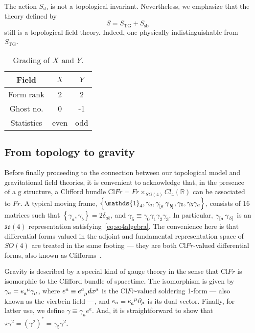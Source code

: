 \documentclass[../main.tex]{subfiles}
\begin{document}
The action $S_{\text{sb}}$ is not a topological invariant. Nevertheless, we emphasize that the theory defined by
\begin{equation}
  \label{eq:tg+sb}
  S=S_{\text{TG}}+S_{\text{sb}}
\end{equation}
still is a topological field theory. Indeed, one physically indistinguishable from $S_{\text{TG}}$.
\begin{table}[htpb]
  \caption{Grading of $X$ and $Y$.}%
  \label{tab:grading2}
  \begin{tabular}{ccc}
    \toprule
    Field      & $X$  & $Y$ \\
    \midrule
    Form rank  & 2    & 2   \\
    Ghost no.  & 0    & -1  \\
    Statistics & even & odd \\
    \bottomrule
  \end{tabular}
\end{table}

\subsection{From topology to gravity}%
\label{ssec:from_top_to_grav;sec:top_grav}

Before finally proceeding to the connection between our topological model and gravitational field theories, it is convenient to acknowledge that, in the presence of a $ \mathrm{g} $ structure, a Clifford bundle $ \mathrm{Cl} Fr= Fr \times_{SO(4)}Cl_4 \left( \mathbb{R} \right)$ can be associated to $ Fr $. A typical moving frame, $\left\{ \mathds{1}_4, \gamma_a, \tensor{ \gamma }{ _{ \left[ a \right. } } \tensor{ \gamma }{ _{ \left. b \right] } }, \gamma_5, \gamma_5 \gamma_a \right\}$, consists of 16 matrices such that $ \left\{ \gamma_a, \gamma_b \right\} = 2 \delta_{ab}$, and $\gamma_5 \equiv \gamma_0 \gamma_1 \gamma_2 \gamma_3 $. In particular, $\tensor{ \gamma }{ _{ \left[ a \right. } } \tensor{ \gamma }{ _{ \left. b \right] } }$ is an $\mathfrak{so}\left( 4 \right)$ representation satisfying~\eqref{eq:so4algebra}. The convenience here is that differential forms valued in the adjoint and fundamental representation space of $SO(4)$ are treated in the same footing --- they are both $ \mathrm{Cl}Fr $-valued differential forms, also known as Clifforms~\cite{benn1987a,mielke2001a,mielke2017a}. %

Gravity is described by a special kind of gauge theory in the sense that $ \mathrm{Cl}Fr $ is isomorphic to the Clifford bundle of spacetime. The isomorphism is given by $\gamma_a = \tensor{ e }{ _a^\mu } \gamma_\mu $, where $e^a \equiv \tensor{ e }{ ^a_\mu } dx^\mu $ is the $\mathrm{Cl}Fr$-valued soldering 1-form --- also known as the vierbein field ---, and $ e_a \equiv \tensor{ e }{ _a^\mu }\partial_{ \mu }$ is its dual vector. Finally, for latter use, we define $ \gamma \equiv \gamma_a e^a $. And, it is straightforward to show that $\star \gamma^2 = {\left( \gamma^2 \right)}^*= \gamma_5 \gamma^2$.
\end{document}
